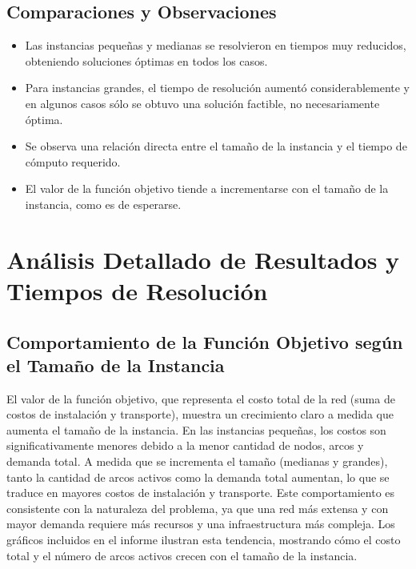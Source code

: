 \documentclass[a4paper,12pt]{article}
\begin{document}
\subsection{Comparaciones y Observaciones}
\begin{itemize}
    \item Las instancias pequeñas y medianas se resolvieron en tiempos muy reducidos, obteniendo soluciones óptimas en todos los casos.
    \item Para instancias grandes, el tiempo de resolución aumentó considerablemente y en algunos casos sólo se obtuvo una solución factible, no necesariamente óptima.
    \item Se observa una relación directa entre el tamaño de la instancia y el tiempo de cómputo requerido.
    \item El valor de la función objetivo tiende a incrementarse con el tamaño de la instancia, como es de esperarse.
\end{itemize}

\section{Análisis Detallado de Resultados y Tiempos de Resolución}

\subsection{Comportamiento de la Función Objetivo según el Tamaño de la Instancia}
El valor de la función objetivo, que representa el costo total de la red (suma de costos de instalación y transporte), muestra un crecimiento claro a medida que aumenta el tamaño de la instancia. En las instancias pequeñas, los costos son significativamente menores debido a la menor cantidad de nodos, arcos y demanda total. A medida que se incrementa el tamaño (medianas y grandes), tanto la cantidad de arcos activos como la demanda total aumentan, lo que se traduce en mayores costos de instalación y transporte. Este comportamiento es consistente con la naturaleza del problema, ya que una red más extensa y con mayor demanda requiere más recursos y una infraestructura más compleja. Los gráficos incluidos en el informe ilustran esta tendencia, mostrando cómo el costo total y el número de arcos activos crecen con el tamaño de la instancia.
\end{document}
